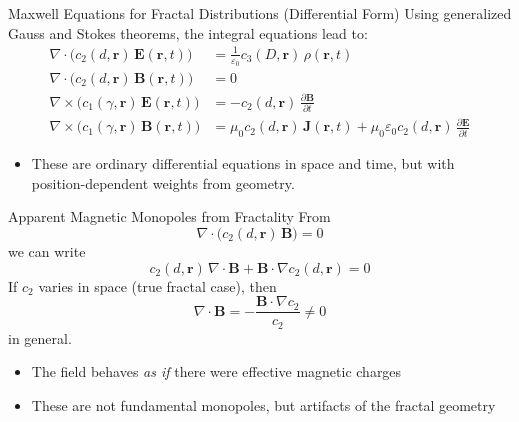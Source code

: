 \documentclass[11pt]{beamer}
\begin{document}
\begin{frame}{Maxwell Equations for Fractal Distributions (Differential Form)}
Using generalized Gauss and Stokes theorems, the integral equations lead to:
\begin{align*}
  \nabla \cdot \bigl( c_2(d,\bm r)\, \bm E(\bm r,t) \bigr)
    &= \frac{1}{\varepsilon_0} c_3(D,\bm r)\, \rho(\bm r,t) \\
  \nabla \cdot \bigl( c_2(d,\bm r)\, \bm B(\bm r,t) \bigr)
    &= 0 \\
  \nabla \times \bigl( c_1(\gamma,\bm r)\, \bm E(\bm r,t) \bigr)
    &= - c_2(d,\bm r)\, \frac{\partial \bm B}{\partial t} \\
  \nabla \times \bigl( c_1(\gamma,\bm r)\, \bm B(\bm r,t) \bigr)
    &= \mu_0 c_2(d,\bm r)\, \bm J(\bm r,t)
     + \mu_0 \varepsilon_0 c_2(d,\bm r)\, \frac{\partial \bm E}{\partial t}
\end{align*}
\begin{itemize}
  \item These are ordinary differential equations in space and time, but with position-dependent weights from geometry.
\end{itemize}
\end{frame}

\begin{frame}{Apparent Magnetic Monopoles from Fractality}
From
\begin{equation*}
  \nabla \cdot \bigl( c_2(d,\bm r)\, \bm B \bigr) = 0
\end{equation*}
we can write
\begin{equation*}
  c_2(d,\bm r)\, \nabla \cdot \bm B + \bm B \cdot \nabla c_2(d,\bm r) = 0
\end{equation*}
If $c_2$ varies in space (true fractal case), then
\begin{equation*}
  \nabla \cdot \bm B = - \frac{\bm B \cdot \nabla c_2}{c_2} \neq 0
\end{equation*}
in general.
\begin{itemize}
  \item The field behaves \emph{as if} there were effective magnetic charges
  \item These are not fundamental monopoles, but artifacts of the fractal geometry
\end{itemize}
\end{frame}
\end{document}
